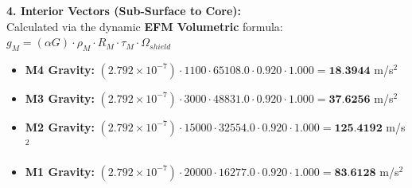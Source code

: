 \documentclass[11pt, a4paper]{article}
\begin{document}
  \vspace{0.5em}
  \noindent \textbf{4. Interior Vectors (Sub-Surface to Core):} \\[0.5em]
  \hspace*{1em} Calculated via the dynamic \textbf{EFM Volumetric} formula: $g_M = (\alpha G) \cdot \rho_{M} \cdot R_M \cdot \tau_M \cdot \Omega_{shield}$
  \begin{itemize}
    \item \textbf{M4 Gravity:} $(2.792 \times 10^{-7}) \cdot 1100 \cdot 65108.0 \cdot 0.920 \cdot 1.000 = \textbf{18.3944}$ m/s$^2$
    \item \textbf{M3 Gravity:} $(2.792 \times 10^{-7}) \cdot 3000 \cdot 48831.0 \cdot 0.920 \cdot 1.000 = \textbf{37.6256}$ m/s$^2$
    \item \textbf{M2 Gravity:} $(2.792 \times 10^{-7}) \cdot 15000 \cdot 32554.0 \cdot 0.920 \cdot 1.000 = \textbf{125.4192}$ m/s$^2$
    \item \textbf{M1 Gravity:} $(2.792 \times 10^{-7}) \cdot 20000 \cdot 16277.0 \cdot 0.920 \cdot 1.000 = \textbf{83.6128}$ m/s$^2$
  \end{itemize}
\end{document}
